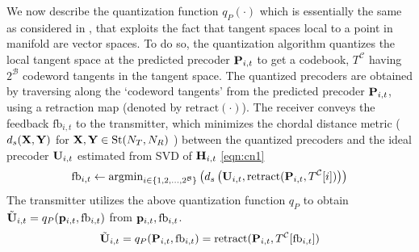 \documentclass[conference]{IEEEtran}
\begin{document}
{We now describe the quantization function $q_P(\cdot)$ which is essentially the same as considered in \cite{Gupt1905:Predictive,6891198}, that exploits the fact that tangent spaces local to a point in manifold are vector spaces. To do so, the quantization algorithm quantizes the local tangent space at the predicted precoder ${\bf P}_{i,t}$ to get a codebook, $T^\mathcal{C}$ having $2^{\mathcal{B}}$ codeword tangents in the tangent space. The quantized precoders are obtained by traversing along the `codeword tangents' from the predicted precoder ${\bf P}_{i,t}$, using a retraction map (denoted by $\text{retract}(\cdot)$). The receiver conveys the feedback $\text{fb}_{i,t}$ to the transmitter, which minimizes the chordal distance metric ($d_s({\bf X},{\bf Y})$ for ${\bf X},{\bf Y} \in \text{St}(N_T,N_R)$ \cite{Gupt1905:Predictive,6891198}) between the quantized precoders and the ideal precoder ${\bf U}_{i,t}$ estimated from SVD of ${\bf H}_{i,t}$ \eqref{eqn:cn1}
 \begin{equation}
\label{eqn:cn1}
\text{fb}_{i,t} \gets \text{argmin}_{i \in \{1,2,\ldots,2^{\mathcal{B}}\}}\left (d_s\left (\bU_{i,t},\text{retract}(\bP_{i,t},T^\mathcal{C}[i])\right ) \right)
\end{equation}
The transmitter utilizes the above quantization function $q_P$ to obtain $\tilde{{\bf U}}_{i,t}=q_P({\bf p}_{i,t},\text{fb}_{i,t})$ from ${\bf p}_{i,t},\text{fb}_{i,t}$.
\begin{equation}
\tilde{\bU}_{i,t}=q_P(\bP_{i,t},\text{fb}_{i,t})=\text{retract}(\bP_{i,t},T^\mathcal{C}[\text{fb}_{i,t}])
\label{eqn:cn2}
\end{equation}

}
\end{document}
